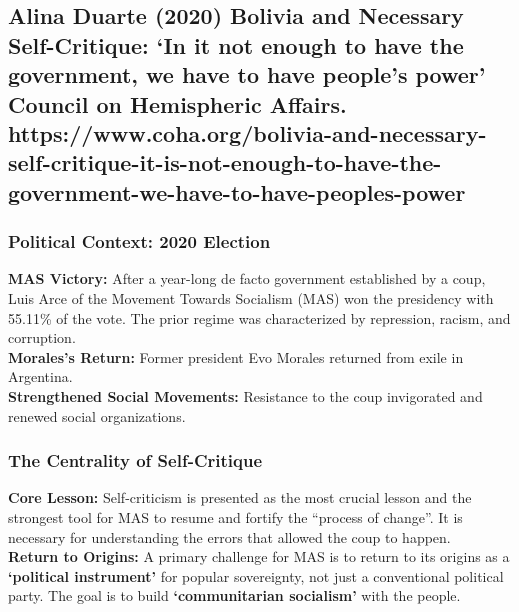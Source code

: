 \documentclass{article}
\begin{document}
    \subsection{Alina Duarte (2020) Bolivia and Necessary Self-Critique: ‘In it not enough to have the government, we have to have people’s power’ Council on Hemispheric Affairs. https://www.coha.org/bolivia-and-necessary-self-critique-it-is-not-enough-to-have-the-government-we-have-to-have-peoples-power}

    \subsubsection{Political Context: 2020 Election}

    \noindent \textbf{MAS Victory:} After a year-long de facto government
established by a coup, Luis Arce of the Movement Towards Socialism (MAS) won
the presidency with 55.11\% of the vote. The prior regime was characterized
by repression, racism, and corruption.\\

    \noindent \textbf{Morales's Return:} Former president Evo Morales
returned from exile in Argentina.\\

    \noindent \textbf{Strengthened Social Movements:} Resistance to the coup
invigorated and renewed social organizations.

\subsubsection{The Centrality of Self-Critique}

    \noindent \textbf{Core Lesson:} Self-criticism is presented as the most
crucial lesson and the strongest tool for MAS to resume and fortify the
``process of change''. It is necessary for understanding the errors that
allowed the coup to happen.\\

    \noindent \textbf{Return to Origins:} A primary challenge for MAS is to
return to its origins as a \textbf{`political instrument'} for popular
sovereignty, not just a conventional political party. The goal is to build \textbf{`communitarian socialism'} with the people.
\end{document}
